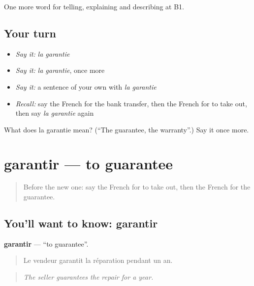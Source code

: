 \begin{grammarlens}[title={What you've built}]
One more word for telling, explaining and describing at B1.
\end{grammarlens}

\subsection*{Your turn}
\begin{itemize}
\raggedright
  \item \emph{Say it:} \emph{la garantie}
  \item \emph{Say it:} \emph{la garantie}, once more
  \item \emph{Say it:} a sentence of your own with \emph{la garantie}
  \item \emph{Recall:} say the French for the bank transfer, then the French for to take out, then say \emph{la garantie} again
\end{itemize}

\begin{tcolorbox}[breakable,colback=teal!4,colframe=teal!35!black,title={Before you move on}]
What does la garantie mean? (\textquotedblleft{}The guarantee, the warranty\textquotedblright{}.) Say it once more.
\end{tcolorbox}
\section[garantir]{garantir — to guarantee}

\label{lesson:FR-C393-garantir}



\begin{quote}
Before the new one: say the French for to take out, then the French for the guarantee.
\end{quote}

\subsection*{You'll want to know: garantir}
\textbf{garantir} — \textquotedblleft{}to guarantee\textquotedblright{}.

\begin{quote}
Le vendeur garantit la réparation pendant un an.
\end{quote}

\begin{quote}
\emph{The seller guarantees the repair for a year.}
\end{quote}

